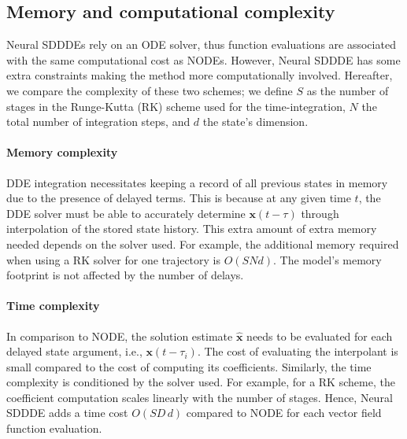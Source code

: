 \subsection{Memory and computational complexity} Neural SDDDEs rely on an ODE solver, thus function evaluations are associated with the same computational cost as NODEs. However, Neural SDDDE has some extra constraints making the method more computationally involved. Hereafter, we compare the complexity of these two schemes; we define $S$ as the number of stages in the Runge-Kutta (RK) scheme used for the time-integration, $N$ the total number of integration steps, and $d$ the state's dimension. 

\paragraph{Memory complexity} DDE integration necessitates keeping a record of all previous states in memory due to the presence of delayed terms. This is because at any given time $t$, the DDE solver must be able to accurately determine $\mathbf{x}(t-\tau)$ through interpolation of the stored state history. This extra amount of extra memory needed depends on the solver used. For example, the additional memory required when using a RK solver for one trajectory is $O(SNd)$. The model's memory footprint is not affected by the number of delays. 

\paragraph{Time complexity} In comparison to NODE, the solution estimate $\widehat{\mathbf{x}}$ needs to be evaluated for each delayed state argument, i.e., $\mathbf{x}(t-\tau_i)$. The cost of evaluating the interpolant is small compared to the cost of computing its coefficients. Similarly, the time complexity is conditioned by the solver used. For example, for a RK scheme, the coefficient computation scales linearly with the number of stages. Hence, Neural SDDDE adds a time cost $O(SD\,d)$ compared to NODE for each vector field function evaluation.